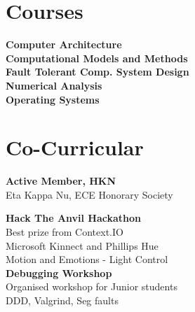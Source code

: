 \documentclass[letterpaper]{deedy-resume}
\begin{document}
\begin{minipage}[t]{0.33\textwidth}
\sectionspace %


\section{Courses}


\textbf{Computer Architecture} \\
\textbf{Computational Models and Methods}  \\
\textbf{Fault Tolerant Comp. System Design} \\
\textbf{Numerical Analysis} \\
\textbf{Operating Systems} \\

\sectionspace %

\section{Co-Curricular}

\textbf{Active Member, HKN} \\
Eta Kappa Nu, ECE Honorary Society\\
\sectionspace %

\textbf{Hack The Anvil Hackathon}\\
\textbullet{} Best prize from Context.IO\\
\textbullet{} Microsoft Kinnect and Phillips Hue \\
\textbullet{} Motion and Emotions - Light Control\\
\sectionspace %
\textbf{Debugging Workshop}\\
\textbullet{} Organised workshop for Junior students\\
\textbullet{} DDD, Valgrind, Seg faults \\



\end{minipage}
\end{document}
